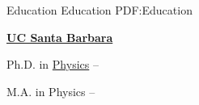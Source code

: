 \documentclass[letterpaper,MMMyyyy,nonstopmode]{simpleresumecv}
\begin{document}
\begin{Body}
\begin{Detail}
\begin{Detail}
\begin{Detail}
\end{Detail}
\vspace{1mm}









\Section
{Education}
{Education}
{PDF:Education}
\begin{Detail}
\Entry
\href{http://www.ucsb.edu}
{\textbf{UC Santa Barbara}}

\Gap
\BulletItem
Ph.D. in
\href{http://web.physics.ucsb.edu/~astrogroup/}
{Physics}
\hfill
{} --


\Gap
\BulletItem
M.A. in Physics
\hfill
{} --


\end{Detail}
\end{Detail}
\end{Detail}
\end{Body}
\end{document}
